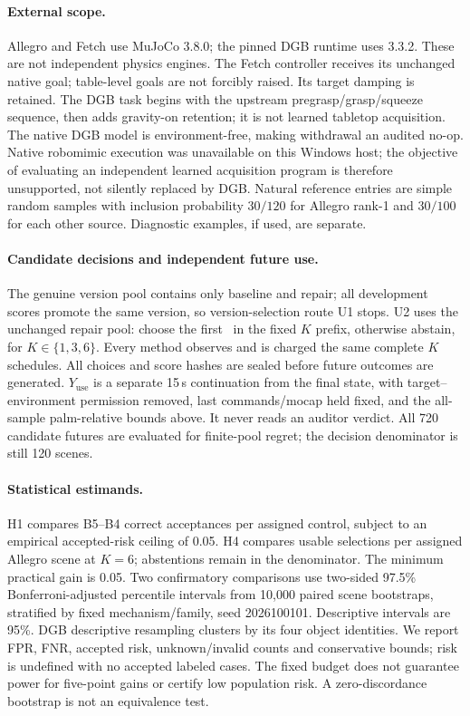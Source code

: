 \paragraph{External scope.}
Allegro and Fetch use MuJoCo 3.8.0; the pinned DGB runtime uses 3.3.2. These are
not independent physics engines. The Fetch controller receives its unchanged
native goal; table-level goals are not forcibly raised. Its target damping is
retained. The DGB task begins with the upstream pregrasp/grasp/squeeze sequence,
then adds gravity-on retention; it is not learned tabletop acquisition. The
native DGB model is environment-free, making withdrawal an audited no-op.
Native robomimic execution was unavailable on this Windows host; the objective
of evaluating an independent learned acquisition program is therefore
unsupported, not silently replaced by DGB. Natural reference entries are simple
random samples with inclusion probability $30/120$ for Allegro rank-1 and
$30/100$ for each other source. Diagnostic examples, if used, are separate.

\paragraph{Candidate decisions and independent future use.}
The genuine version pool contains only baseline and repair; all development
scores promote the same version, so version-selection route U1 stops. U2 uses
the unchanged repair pool: choose the first \Pass\ in the fixed $K$ prefix,
otherwise abstain, for $K\in\{1,3,6\}$. Every method observes and is charged the
same complete $K$ schedules. All choices and score hashes are sealed before
future outcomes are generated. $Y_{\mathrm{use}}$ is a separate 15\,s
continuation from the final state, with target--environment permission removed,
last commands/mocap held fixed, and the all-sample palm-relative bounds above.
It never reads an auditor verdict. All 720 candidate futures are evaluated for
finite-pool regret; the decision denominator is still 120 scenes.

\paragraph{Statistical estimands.}
H1 compares B5--B4 correct acceptances per assigned control, subject to an
empirical accepted-risk ceiling of 0.05. H4 compares usable selections per
assigned Allegro scene at $K=6$; abstentions remain in the denominator. The
minimum practical gain is 0.05. Two confirmatory comparisons use two-sided
97.5\% Bonferroni-adjusted percentile intervals from 10,000 paired scene
bootstraps, stratified by fixed mechanism/family, seed 2026100101. Descriptive
intervals are 95\%. DGB descriptive resampling clusters by its four object
identities. We report FPR, FNR, accepted risk, unknown/invalid counts and
conservative bounds; risk is undefined with no accepted labeled cases.
The fixed budget does not guarantee power for five-point gains or certify low
population risk. A zero-discordance bootstrap is not an equivalence test.

